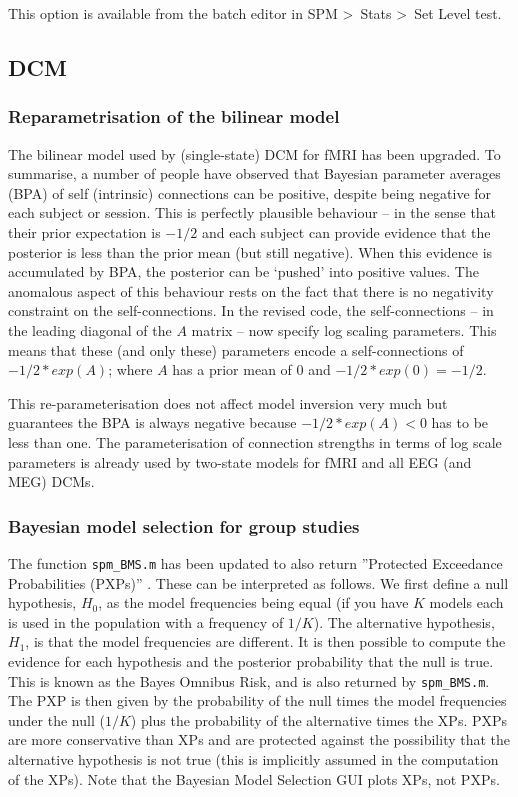 \documentclass[a4paper,titlepage,openany]{article}
\begin{document}
This option is available from the batch editor in SPM \textgreater\ Stats \textgreater\ Set Level test.

\subsection{DCM}

\subsubsection{Reparametrisation of the bilinear model}

The bilinear model used by (single-state) DCM for fMRI has been upgraded. To summarise, a number of people have observed that Bayesian parameter averages (BPA) of self (intrinsic) connections can be positive, despite being negative for each subject or session. This is perfectly plausible behaviour -- in the sense that their prior expectation is $-1/2$ and each subject can provide evidence that the posterior is less than the prior mean (but still negative). When this evidence is accumulated by BPA, the posterior can be `pushed' into positive values. The anomalous aspect of this behaviour rests on the fact that there is no negativity constraint on the self-connections.  In the revised code, the self-connections -- in the leading diagonal of the $A$ matrix -- now specify log scaling parameters. This means that these (and only these) parameters encode a self-connections of $-1/2*exp(A)$; where $A$ has a prior mean of $0$ and $-1/2*exp(0) = -1/2$.

This re-parameterisation does not affect model inversion very much but guarantees the BPA is always negative because $-1/2*exp(A) < 0$ has to be less than one. The parameterisation of connection strengths in terms of log scale parameters is already used by two-state models for fMRI and all EEG (and MEG) DCMs.

\subsubsection{Bayesian model selection for group studies}

The function \texttt{spm\_BMS.m} has been updated to also return ''Protected Exceedance Probabilities (PXPs)'' \cite{Rigoux2014}. 
These can be interpreted as follows. We first define a null hypothesis, $H_0$, as the model frequencies being equal (if you have $K$ models each is used in the population with a frequency of $1/K$). The alternative hypothesis, $H_1$, is that the model frequencies are different. It is then possible to compute the evidence for each hypothesis and the posterior probability that the null is true. This is known as the Bayes Omnibus Risk, and is also returned by \texttt{spm\_BMS.m}. The PXP is then given by the probability of the null times the model frequencies under the null ($1/K$) plus the probability of the alternative times the XPs. PXPs are more conservative than XPs and are protected against the possibility that the alternative hypothesis is not true (this is implicitly assumed in the computation of the XPs). Note that the Bayesian Model Selection GUI plots XPs, not PXPs.
\end{document}
